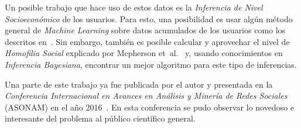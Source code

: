 \documentclass{article}
\begin{document}
Un posible trabajo que hace uso de estos datos es la \emph{Inferencia de Nivel Socioeconómico} de los usuarios. Para esto, una posibilidad es usar algún método general de \emph{Machine Learning} sobre datos acumulados de los usuarios como los descritos en~\cite{oskardottir2016}. Sin embargo, también es posible calcular y aprovechar el nivel de \emph{Homofilia Social} explicado por Mcpherson et~al.~\cite{mcpherson2001birds} y, usando conocimientos en \emph{Inferencia Bayesiana}, encontrar un mejor algoritmo para este tipo de inferencias.

Una parte de este trabajo ya fue publicada por el autor y presentada en la \emph{Conferencia Internacional en Avances en Análisis y Minería de Redes Sociales} (ASONAM) en el año 2016~\cite{fixman2016bayesian}. En esta conferencia se pudo observar lo novedoso e interesante del problema al público científico general.

{}
\end{document}
